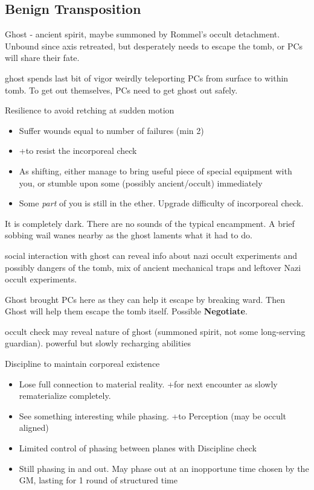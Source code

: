 \documentclass[background]{book}
\newcommand{\df}{\DifficultyDie}
\newcommand{\stb}{\SetbackDie}
\newcommand{\ch}{\ChallengeDie}
\newcommand{\bbb}{\BoostDie}
\begin{document}
\begin{multicols}{2}
\section{Benign Transposition}

Ghost - ancient spirit, maybe summoned by Rommel's occult detachment.  Unbound since axis retreated, but desperately needs to escape the tomb, or PCs will share their fate.

ghost spends last bit of vigor weirdly teleporting PCs from surface to within tomb.  To get out themselves, PCs need to get ghost out safely.

\df\df\df Resilience to avoid retching at sudden motion
    \begin{itemize}
        \item \Failure Suffer wounds equal to number of failures (min 2)
        \item \Advantage +\bbb to resist the incorporeal check
        \item \Triumph As shifting, either manage to bring useful piece of special equipment with you, or stumble upon some (possibly ancient/occult) immediately
        \item \Despair Some \emph{part} of you is still in the ether.  Upgrade difficulty of incorporeal check.
    \end{itemize}


It is completely dark.  There are no sounds of the typical encampment.  A brief sobbing wail wanes nearby as the ghost laments what it had to do.

social interaction with ghost can reveal info about nazi occult experiments and possibly dangers of the tomb, mix of ancient mechanical traps and leftover Nazi occult experiments.

    Ghost brought PCs here as they can help it escape by breaking ward.  Then Ghost will help them escape the tomb itself.  Possible \textbf{Negotiate}.

    occult check may reveal nature of ghost (summoned spirit, not some long-serving guardian).  powerful but slowly recharging abilities

\ch\df Discipline to maintain corporeal existence
    \begin{itemize}
        \item \Failure Lose full connection to material reality.  +\stb for next encounter as slowly rematerialize completely.
        \item \Advantage See something interesting while phasing.  +\bbb to Perception (may be occult aligned)
        \item \Triumph Limited control of phasing between planes with \df\df\df Discipline check
        \item \Despair Still phasing in and out.  May phase out at an inopportune time chosen by the GM, lasting for 1 round of structured time
    \end{itemize}


\end{multicols}
\end{document}
